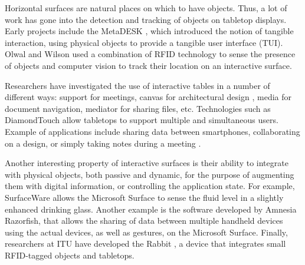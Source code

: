  
Horizontal surfaces are natural places on which to have objects.
Thus, a lot of work has gone into the detection and tracking of objects on tabletop displays.
Early projects include the MetaDESK \citep{Ullmer:1997:metadesk}, which introduced the notion of tangible interaction, using physical objects to provide a tangible user interface (TUI).
Olwal and Wilson \citeyearpar{Olwal:2008:surfacefusion} used a combination of RFID technology to sense the presence of objects and computer vision to track their location on an interactive surface.

Researchers have investigated the use of interactive tables in a number of different ways: support for meetings, canvas for architectural design \cite{Clifton:2010:sketchtop}, media for document navigation, mediator for sharing files, etc.
Technologies such as DiamondTouch \cite{Dietz:2001:diamondtouch} allow tabletops to support multiple and simultaneous users. Example of applications include sharing data between smartphones, collaborating on a design, or simply taking notes during a meeting \cite{Hunter:2011:memtable}.


Another interesting property of interactive surfaces is their ability to integrate with physical objects, both passive and dynamic, for the purpose of augmenting them with digital information, or controlling the application state.
For example, SurfaceWare \cite{Dietz:2009:surfaceware} allows the Microsoft Surface to sense the fluid level in a slightly enhanced drinking glass.
Another example is the software developed by Amnesia Razorfish, that allows the sharing of data between multiple handheld devices using the actual devices, as well as gestures, on the Microsoft Surface.
Finally, researchers at ITU have developed the Rabbit \cite{Hincapie:2011:rabbit}, a device that integrates small RFID-tagged objects and tabletops.





